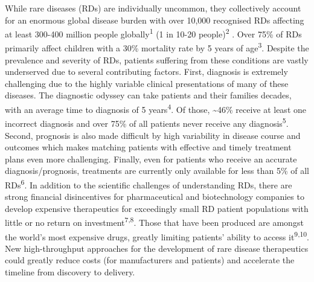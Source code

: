 \documentclass[
]{report}
\begin{document}
While rare diseases (RDs) are individually uncommon, they collectively
account for an enormous global disease burden with over 10,000
recognised RDs affecting at least 300-400 million people
globally\textsuperscript{1} (1 in 10-20 people)\textsuperscript{2} .
Over 75\% of RDs primarily affect children with a 30\% mortality rate by
5 years of age\textsuperscript{3}. Despite the prevalence and severity
of RDs, patients suffering from these conditions are vastly underserved
due to several contributing factors. First, diagnosis is extremely
challenging due to the highly variable clinical presentations of many of
these diseases. The diagnostic odyssey can take patients and their
families decades, with an average time to diagnosis of 5
years\textsuperscript{4}. Of those, \textasciitilde46\% receive at least
one incorrect diagnosis and over 75\% of all patients never receive any
diagnosis\textsuperscript{5}. Second, prognosis is also made difficult
by high variability in disease course and outcomes which makes matching
patients with effective and timely treatment plans even more
challenging. Finally, even for patients who receive an accurate
diagnosis/prognosis, treatments are currently only available for less
than 5\% of all RDs\textsuperscript{6}. In addition to the scientific
challenges of understanding RDs, there are strong financial
disincentives for pharmaceutical and biotechnology companies to develop
expensive therapeutics for exceedingly small RD patient populations with
little or no return on investment\textsuperscript{7,8}. Those that have
been produced are amongst the world's most expensive drugs, greatly
limiting patients' ability to access it\textsuperscript{9,10}. New
high-throughput approaches for the development of rare disease
therapeutics could greatly reduce costs (for manufacturers and patients)
and accelerate the timeline from discovery to delivery.
\end{document}
